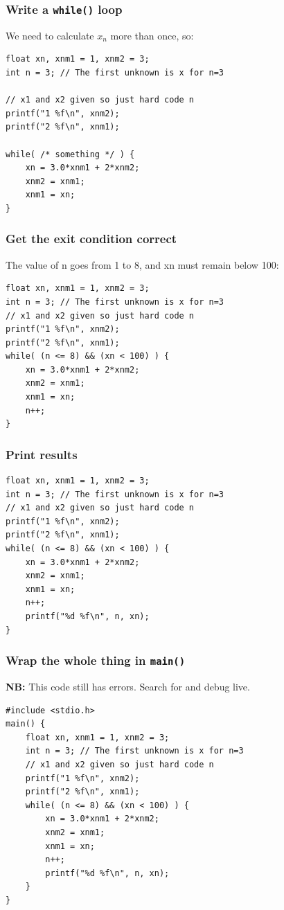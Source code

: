 \documentclass[14pt]{beamer}
\begin{document}
\begin{frame}[fragile]
\frametitle{Write a \texttt{while()} loop}
We need to calculate $x_n$ more than once, so:
\begin{lstlisting}[style=CStyle]
float xn, xnm1 = 1, xnm2 = 3;
int n = 3; // The first unknown is x for n=3

// x1 and x2 given so just hard code n
printf("1 %f\n", xnm2);
printf("2 %f\n", xnm1);

while( /* something */ ) {
	xn = 3.0*xnm1 + 2*xnm2;
	xnm2 = xnm1;
	xnm1 = xn;
}
\end{lstlisting}
\end{frame}

\begin{frame}[fragile]
\frametitle{Get the exit condition correct}
The value of n goes from 1 to 8, and xn must remain below 100:
\begin{lstlisting}[style=CStyle]
float xn, xnm1 = 1, xnm2 = 3;
int n = 3; // The first unknown is x for n=3
// x1 and x2 given so just hard code n
printf("1 %f\n", xnm2);
printf("2 %f\n", xnm1);
while( (n <= 8) && (xn < 100) ) {
	xn = 3.0*xnm1 + 2*xnm2;
	xnm2 = xnm1;
	xnm1 = xn;
	n++;
}
\end{lstlisting}
\end{frame}

\begin{frame}[fragile]
\frametitle{Print results}
\begin{lstlisting}[style=CStyle]
float xn, xnm1 = 1, xnm2 = 3;
int n = 3; // The first unknown is x for n=3
// x1 and x2 given so just hard code n
printf("1 %f\n", xnm2);
printf("2 %f\n", xnm1);
while( (n <= 8) && (xn < 100) ) {
	xn = 3.0*xnm1 + 2*xnm2;
	xnm2 = xnm1;
	xnm1 = xn;
	n++;
	printf("%d %f\n", n, xn);
}
\end{lstlisting}
\end{frame}

\begin{frame}[fragile]
\frametitle{Wrap the whole thing in \texttt{main()}}
\textbf{NB:} This code still has errors. Search for and debug live.
{\small
\begin{lstlisting}[style=CStyle]
#include <stdio.h>
main() {
	float xn, xnm1 = 1, xnm2 = 3;
	int n = 3; // The first unknown is x for n=3
	// x1 and x2 given so just hard code n
	printf("1 %f\n", xnm2);
	printf("2 %f\n", xnm1);
	while( (n <= 8) && (xn < 100) ) {
		xn = 3.0*xnm1 + 2*xnm2;
		xnm2 = xnm1;
		xnm1 = xn;
		n++;
		printf("%d %f\n", n, xn);
	}
}
\end{lstlisting}
}
\end{frame}
\end{document}
